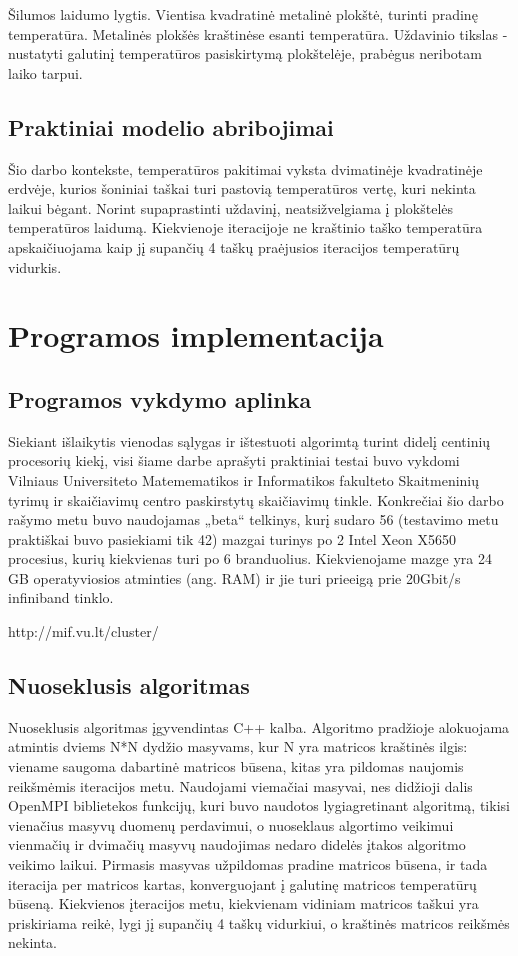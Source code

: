 \documentclass{VUMIFPSbakalaurinis}
\begin{document}
Šilumos laidumo lygtis. Vientisa kvadratinė metalinė plokštė, turinti pradinę temperatūra. 
Metalinės plokšės kraštinėse esanti temperatūra. 
Uždavinio tikslas - nustatyti galutinį temperatūros pasiskirtymą plokštelėje, prabėgus neribotam laiko tarpui. 

\subsection{Praktiniai modelio abribojimai}

Šio darbo kontekste, temperatūros pakitimai vyksta dvimatinėje kvadratinėje erdvėje, kurios šoniniai taškai turi pastovią temperatūros vertę, kuri nekinta laikui bėgant.
Norint supaprastinti uždavinį, neatsižvelgiama į plokštelės temperatūros laidumą.
Kiekvienoje iteracijoje ne kraštinio taško temperatūra apskaičiuojama kaip jį supančių 4 taškų praėjusios iteracijos temperatūrų vidurkis.

\section{Programos implementacija}

\subsection{Programos vykdymo aplinka}

Siekiant išlaikytis vienodas sąlygas ir ištestuoti algorimtą turint didelį centinių procesorių kiekį, visi šiame darbe aprašyti praktiniai testai buvo vykdomi Vilniaus Universiteto Matemematikos ir Informatikos fakulteto Skaitmeninių tyrimų ir skaičiavimų centro paskirstytų skaičiavimų tinkle.
Konkrečiai šio darbo rašymo metu buvo naudojamas „beta“ telkinys, kurį sudaro 56 (testavimo metu praktiškai buvo pasiekiami tik 42) mazgai turinys po 2 Intel Xeon X5650 procesius, kurių kiekvienas turi po 6 branduolius. 
Kiekvienojame mazge yra 24 GB operatyviosios atminties (ang. RAM) ir jie turi prieeigą prie 20Gbit/s infiniband tinklo. 

http://mif.vu.lt/cluster/



\subsection{Nuoseklusis algoritmas}

Nuoseklusis algoritmas įgyvendintas C++ kalba. 
Algoritmo pradžioje alokuojama atmintis dviems N*N dydžio masyvams, kur N yra matricos kraštinės ilgis: viename saugoma dabartinė matricos būsena, kitas yra pildomas naujomis reikšmėmis iteracijos metu.
Naudojami viemačiai masyvai, nes didžioji dalis OpenMPI biblietekos funkcijų, kuri buvo naudotos lygiagretinant algoritmą, tikisi vienačius masyvų duomenų perdavimui, o nuoseklaus algortimo veikimui vienmačių ir dvimačių masyvų naudojimas nedaro didelės įtakos algoritmo veikimo laikui.
Pirmasis masyvas užpildomas pradine matricos būsena, ir tada iteracija per matricos kartas, konverguojant į galutinę matricos temperatūrų būseną.
Kiekvienos įteracijos metu, kiekvienam vidiniam matricos taškui yra priskiriama reikė, lygi jį supančių 4 taškų vidurkiui, o kraštinės matricos reikšmės nekinta.
\end{document}
